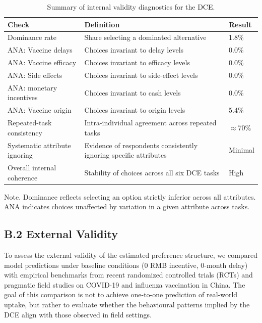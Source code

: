 \documentclass[12pt]{article}
\begin{document}
\begin{table}[H]
\centering
\caption{Summary of internal validity diagnostics for the DCE.}
\label{tab:internal_validity_full}
\begin{tabular}{p{3.6cm} p{5.8cm} p{1.3cm}}
\toprule
\textbf{Check} & \textbf{Definition} & \textbf{Result} \\
\midrule
Dominance rate & Share selecting a dominated alternative & 1.8\% \\

ANA: Vaccine delays & Choices invariant to delay levels & 0.0\% \\
ANA: Vaccine efficacy & Choices invariant to efficacy levels & 0.0\% \\
ANA: Side effects & Choices invariant to side-effect levels & 0.0\% \\
ANA: monetary incentives & Choices invariant to cash levels & 0.0\% \\
ANA: Vaccine origin & Choices invariant to origin levels & 5.4\% \\

Repeated-task consistency & Intra-individual agreement across repeated tasks & $\approx$70\% \\

Systematic attribute ignoring & Evidence of respondents consistently ignoring specific attributes & Minimal \\

Overall internal coherence & Stability of choices across all six DCE tasks & High \\
\bottomrule
\end{tabular}

\begin{flushleft}
\footnotesize
Note. Dominance reflects selecting an option strictly inferior across all attributes. ANA indicates choices 
unaffected by variation in a given attribute across tasks.
\end{flushleft}
\end{table}


\subsection*{B.2 External Validity}

To assess the external validity of the estimated preference structure, we compared model 
predictions under baseline conditions (0 RMB incentive, 0-month delay) with empirical 
benchmarks from recent randomized controlled trials (RCTs) and pragmatic field studies on 
COVID-19 and influenza vaccination in China. The goal of this comparison is not to achieve 
one-to-one prediction of real-world uptake, but rather to evaluate whether the behavioural 
patterns implied by the DCE align with those observed in field settings.
\end{document}
